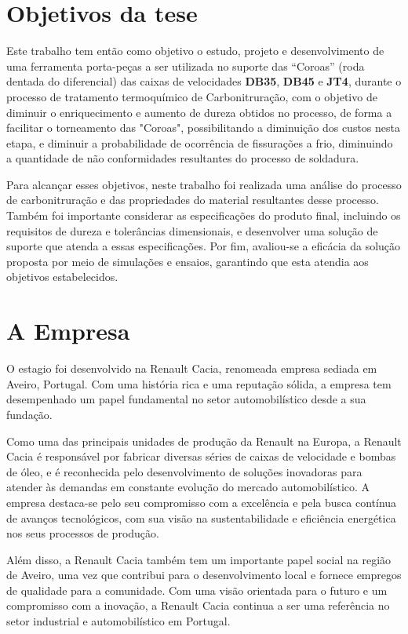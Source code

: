 \section{Objetivos da tese} \label{s:intro_objetivos}
Este trabalho tem então como objetivo o estudo, projeto e desenvolvimento de uma ferramenta porta-peças a ser utilizada no suporte das “Coroas” (roda dentada do diferencial) das caixas de velocidades \textbf{DB35}, \textbf{DB45} e \textbf{JT4}, durante o processo de tratamento termoquímico de Carbonitruração, com o objetivo de diminuir o enriquecimento e aumento de dureza obtidos no processo, de forma a facilitar o torneamento das "Coroas", possibilitando a diminuição dos custos nesta etapa, e diminuir a probabilidade de ocorrência de fissurações a frio, diminuindo a quantidade de não conformidades resultantes do processo de soldadura.
\par
\newpage
Para alcançar esses objetivos, neste trabalho foi realizada uma análise do processo de carbonitruração e das propriedades do material resultantes desse processo. Também foi importante considerar as especificações do produto final, incluindo os requisitos de dureza e tolerâncias dimensionais, e desenvolver uma solução de suporte que atenda a essas especificações. Por fim, avaliou-se a eficácia da solução proposta por meio de simulações e ensaios, garantindo que esta atendia aos objetivos estabelecidos.
\section{A Empresa} \label{s:intro_empresa}
O estagio foi desenvolvido na Renault Cacia, renomeada empresa sediada em Aveiro, Portugal. Com uma história rica e uma reputação sólida, a empresa tem desempenhado um papel fundamental no setor automobilístico desde a sua fundação.
\par
Como uma das principais unidades de produção da Renault na Europa, a Renault Cacia é responsável por fabricar diversas séries de caixas de velocidade e bombas de óleo, e é reconhecida pelo desenvolvimento de soluções inovadoras para atender às demandas em constante evolução do mercado automobilístico. A empresa destaca-se pelo seu compromisso com a excelência e pela busca contínua de avanços tecnológicos, com sua visão na sustentabilidade e eficiência energética nos seus processos de produção.
\par
Além disso, a Renault Cacia também tem um importante papel social na região de Aveiro, uma vez que contribui para o desenvolvimento local e fornece empregos de qualidade para a comunidade. Com uma visão orientada para o futuro e um compromisso com a inovação, a Renault Cacia continua a ser uma referência no setor industrial e automobilístico em Portugal.

